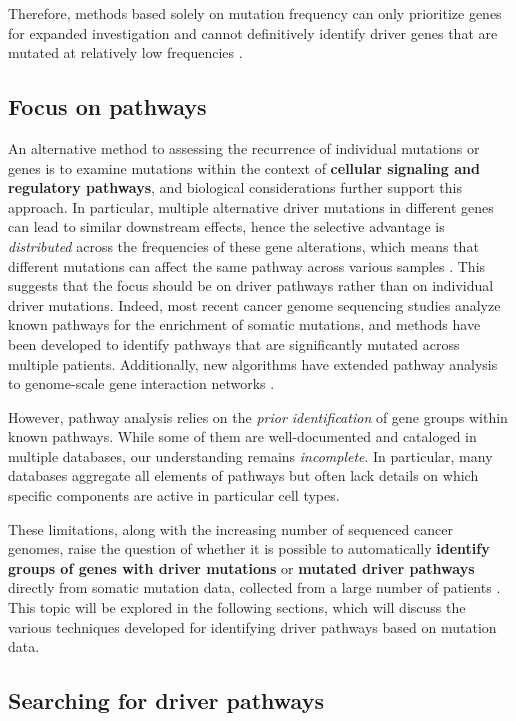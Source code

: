 Therefore, methods based solely on mutation frequency can only prioritize genes for expanded investigation and cannot definitively identify driver genes that are mutated at relatively low frequencies \cite{vogelstein2013}.

\subsection{Focus on pathways}

An alternative method to assessing the recurrence of individual mutations or genes is to examine mutations within the context of \textbf{cellular signaling and regulatory pathways}, and biological considerations further support this approach. In particular, multiple alternative driver mutations in different genes can lead to similar downstream effects, hence the selective advantage is \textit{distributed} across the frequencies of these gene alterations, which means that different mutations can affect the same pathway across various samples \cite{mutex, multi-dendrix}. This suggests that the focus should be on driver pathways rather than on individual driver mutations. Indeed, most recent cancer genome sequencing studies analyze known pathways for the enrichment of somatic mutations, and methods have been developed to identify pathways that are significantly mutated across multiple patients. Additionally, new algorithms have extended pathway analysis to genome-scale gene interaction networks \cite{dendrix}.

However, pathway analysis relies on the \textit{prior identification} of gene groups within known pathways. While some of them are well-documented and cataloged in multiple databases, our understanding remains \textit{incomplete}. In particular, many databases aggregate all elements of pathways but often lack details on which specific components are active in particular cell types.

These limitations, along with the increasing number of sequenced cancer genomes, raise the question of whether it is possible to automatically \textbf{identify groups of genes with driver mutations} or \textbf{mutated driver pathways} directly from somatic mutation data, collected from a large number of patients \cite{dendrix}. This topic will be explored in the following sections, which will discuss the various techniques developed for identifying driver pathways based on mutation data.

\subsection{Searching for driver pathways}


